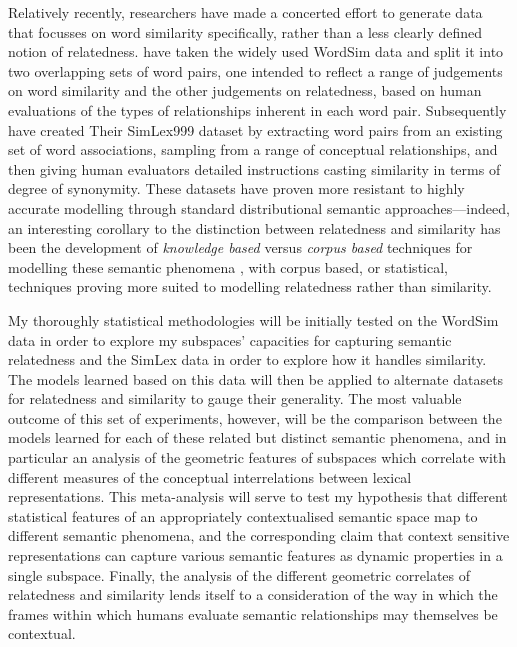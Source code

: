 Relatively recently, researchers have made a concerted effort to generate data that focusses on word similarity specifically, rather than a less clearly defined notion of relatedness.  \cite{AgirreEA2009} have taken the widely used WordSim data and split it into two overlapping sets of word pairs, one intended to reflect a range of judgements on word similarity and the other judgements on relatedness, based on human evaluations of the types of relationships inherent in each word pair.  Subsequently \cite{HillEA2015} have created Their SimLex999 dataset by extracting word pairs from an existing set of word associations, sampling from a range of conceptual relationships, and then giving human evaluators detailed instructions casting similarity in terms of degree of synonymity.  These datasets have proven more resistant to highly accurate modelling through standard distributional semantic approaches---indeed, an interesting corollary to the distinction between relatedness and similarity has been the development of \emph{knowledge based} versus \emph{corpus based} techniques for modelling these semantic phenomena \citep[see][for a discussion]{MihalceaEA2006,HassanEA2011}, with corpus based, or statistical, techniques proving more suited to modelling relatedness rather than similarity.

My thoroughly statistical methodologies will be initially tested on the WordSim data in order to explore my subspaces' capacities for capturing semantic relatedness and the SimLex data in order to explore how it handles similarity.  The models learned based on this data will then be applied to alternate datasets for relatedness and similarity to gauge their generality.  The most valuable outcome of this set of experiments, however, will be the comparison between the models learned for each of these related but distinct semantic phenomena, and in particular an analysis of the geometric features of subspaces which correlate with different measures of the conceptual interrelations between lexical representations.  This meta-analysis will serve to test my hypothesis that different statistical features of an appropriately contextualised semantic space map to different semantic phenomena, and the corresponding claim that context sensitive representations can capture various semantic features as dynamic properties in a single subspace.  Finally, the analysis of the different geometric correlates of relatedness and similarity lends itself to a consideration of the way in which the frames within which humans evaluate semantic relationships may themselves be contextual.

